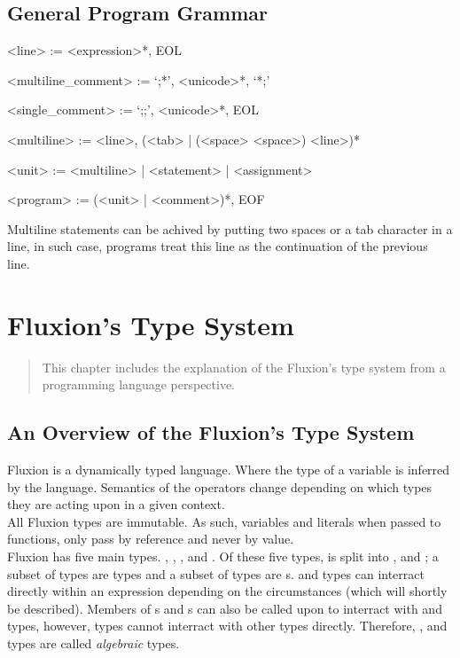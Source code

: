 \documentclass[11pt,a4paper]{book}
\begin{document}
\section{General Program Grammar}

\begin{grammar}
<line> := <expression>*, EOL

<multiline\_comment> := `;*', <unicode>*, `*;'

<single\_comment> := `;;', <unicode>*, EOL

<multiline> := <line>, (<tab> | (<space> <space>) <line>)*

<unit> := <multiline> | <statement> | <assignment>

<program> := (<unit> | <comment>)*, EOF

\end{grammar}

Multiline statements can be achived by putting two spaces or a tab character in a line, in such case, programs treat this line as the continuation of the previous line.

\chapter{Fluxion's Type System}

\vspace{1em}
\begin{quotation}
This chapter includes the explanation of the Fluxion's type system from a programming language perspective.
\end{quotation}
\newpage


\section{An Overview of the Fluxion's Type System}

Fluxion is a dynamically typed language. Where the type of a variable is inferred by the language. Semantics of the operators change depending on which types they are acting upon in a given context. \\

All Fluxion types are immutable. As such, variables and literals when passed to functions, only pass by reference and never by value.\\

Fluxion has five main types. , , ,  and . Of these five types,  is split into ,  and ; a subset of  types are  types and a subset of  types are s.   and  types can interract directly within an expression depending on the circumstances (which will shortly be described). Members of s and s can also be called upon to interract with  and  types, however,  types cannot interract with other types directly. Therefore, ,  and  types are called \textit{algebraic} types.
\end{document}
